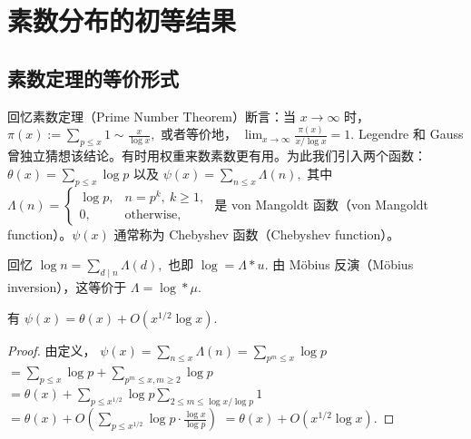 \chapter{素数分布的初等结果}

\section{素数定理的等价形式}


回忆素数定理（Prime Number Theorem）断言：当 $x\to\infty$ 时，
\(\textstyle \pi(x):=\allowbreak{}\sum_{p\leq\allowbreak{} x}1\sim\allowbreak{} \frac{x}{\log x},\allowbreak{}\)
或者等价地，
\(\textstyle \lim_{x\to\allowbreak{}\infty}\frac{\pi(x)}{x/\log x}=\allowbreak{}1.\)
Legendre 和 Gauss 曾独立猜想该结论。有时用权重来数素数更有用。为此我们引入两个函数：
\(\textstyle \theta(x)=\allowbreak{}\sum_{p\leq\allowbreak{} x}\log p\)
以及
\(\textstyle \psi(x)=\allowbreak{}\sum_{n\leq\allowbreak{} x}\Lambda(n),\allowbreak{}\)
其中
\(\textstyle \Lambda(n)= \begin{cases} \log p, & n=p^k,\ k\geq 1,\\ 0, & \text{otherwise}, \end{cases}\)
是 von Mangoldt 函数（von Mangoldt function）。$\psi(x)$ 通常称为 Chebyshev 函数（Chebyshev function）。

回忆
\(\textstyle \log n=\allowbreak{}\sum_{d\mid\allowbreak{} n}\Lambda(d),\allowbreak{}\)
也即
\(\textstyle \log=\allowbreak{}\Lambda*u.\)
由 Möbius 反演（Möbius inversion），这等价于
\(\textstyle \Lambda=\allowbreak{}\log*\mu.\)

\begin{lemma}[原文 Lemma 3.1]
	有
	\(\textstyle \psi(x)=\allowbreak{}\theta(x)+\allowbreak{}O(x^{1/2}\log x).\)
\end{lemma}

\begin{proof}
	由定义，
	\(\textstyle \psi(x) =\allowbreak{} \sum_{n\leq\allowbreak{} x}\Lambda(n) =\allowbreak{} \sum_{p^m\leq\allowbreak{} x}\log p\) \(\textstyle =\allowbreak{} \sum_{p\leq\allowbreak{} x}\log p +\allowbreak{} \sum_{p^m\leq\allowbreak{} x,\allowbreak{} m\geq\allowbreak{} 2}\log p\) \(\textstyle =\allowbreak{} \theta(x)+\allowbreak{} \sum_{p\leq\allowbreak{} x^{1/2}}\log p \sum_{2\leq\allowbreak{} m\leq\allowbreak{} \log x/\log p}1\) \(\textstyle =\allowbreak{} \theta(x)+\allowbreak{} O\left( \sum_{p\leq\allowbreak{} x^{1/2}}\log p\cdot \frac{\log x}{\log p} \right)\) \(\textstyle =\allowbreak{} \theta(x)+\allowbreak{}O(x^{1/2}\log x).\)
\end{proof}

